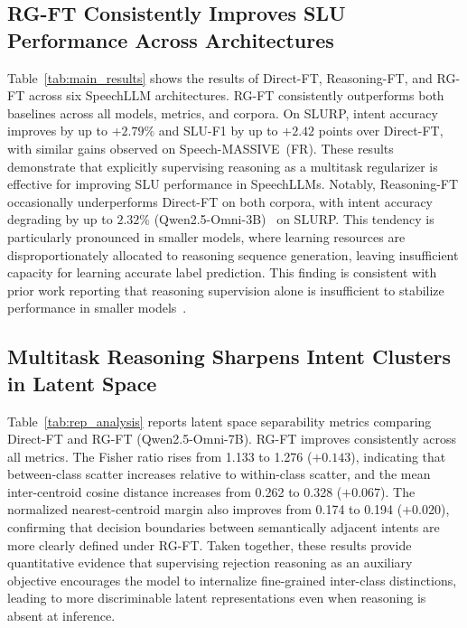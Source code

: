 \documentclass[cameraready]{Interspeech}
\begin{document}
\subsection{RG-FT Consistently Improves SLU Performance Across Architectures}

Table~\ref{tab:main_results} shows the results of Direct-FT, 
Reasoning-FT, and RG-FT across six SpeechLLM architectures.
RG-FT consistently outperforms both baselines across all models, 
metrics, and corpora.
On SLURP, intent accuracy improves by up to $+2.79\%$ and SLU-F1 
by up to $+2.42$ points over Direct-FT, with similar gains observed 
on Speech-MASSIVE~(FR).
These results demonstrate that explicitly supervising reasoning 
as a multitask regularizer is effective for improving SLU performance 
in SpeechLLMs.
Notably, Reasoning-FT occasionally underperforms Direct-FT on both 
corpora, with intent accuracy degrading by up to $2.32\%$ 
(Qwen2.5-Omni-3B)~\cite{xu2025qwen25omni} on SLURP.
This tendency is particularly pronounced in smaller models, 
where learning resources are disproportionately allocated to 
reasoning sequence generation, leaving insufficient capacity 
for learning accurate label prediction.
This finding is consistent with prior work reporting that 
reasoning supervision alone is insufficient to stabilize 
performance in smaller 
models~\cite{li-etal-2025-small-models,chen-etal-2025-unveiling-key,chen-etal-2025-skip,hsieh-etal-2023-distilling}.

\subsection{Multitask Reasoning Sharpens Intent Clusters in Latent Space}

Table~\ref{tab:rep_analysis} reports latent space separability metrics
comparing Direct-FT and RG-FT (Qwen2.5-Omni-7B).
RG-FT improves consistently across all metrics.
The Fisher ratio rises from 1.133 to 1.276 ($+0.143$), indicating
that between-class scatter increases relative to within-class scatter,
and the mean inter-centroid cosine distance increases from 0.262 to
0.328 ($+0.067$).
The normalized nearest-centroid margin also improves from 0.174 to
0.194 ($+0.020$), confirming that decision boundaries between
semantically adjacent intents are more clearly defined under RG-FT.
Taken together, these results provide quantitative evidence that
supervising rejection reasoning as an auxiliary objective encourages
the model to internalize fine-grained inter-class distinctions,
leading to more discriminable latent representations even when
reasoning is absent at inference.
\end{document}
